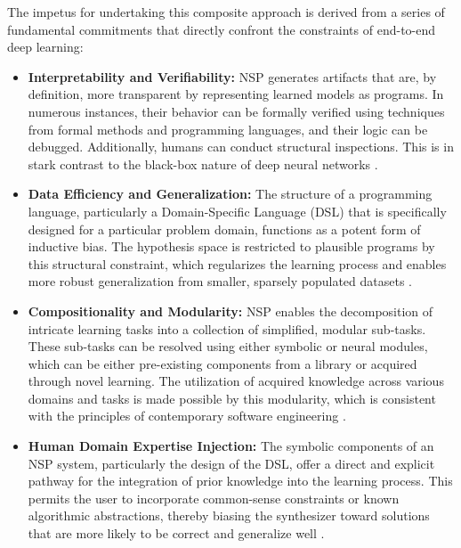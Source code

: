 \documentclass[12pt, a4paper]{report}
\begin{document}
The impetus for undertaking this composite approach is derived from a series of fundamental commitments that directly confront the constraints of end-to-end deep learning:
\begin{itemize}
    \item \textbf{Interpretability and Verifiability:} NSP generates artifacts that are, by definition, more transparent by representing learned models as programs. In numerous instances, their behavior can be formally verified using techniques from formal methods and programming languages, and their logic can be debugged. Additionally, humans can conduct structural inspections. This is in stark contrast to the black-box nature of deep neural networks \citep{bommasani2021opportunities}.
    \item \textbf{Data Efficiency and Generalization:} The structure of a programming language, particularly a Domain-Specific Language (DSL) that is specifically designed for a particular problem domain, functions as a potent form of inductive bias. The hypothesis space is restricted to plausible programs by this structural constraint, which regularizes the learning process and enables more robust generalization from smaller, sparsely populated datasets \citep{bommasani2021opportunities}.
    \item \textbf{Compositionality and Modularity:} NSP enables the decomposition of intricate learning tasks into a collection of simplified, modular sub-tasks. These sub-tasks can be resolved using either symbolic or neural modules, which can be either pre-existing components from a library or acquired through novel learning. The utilization of acquired knowledge across various domains and tasks is made possible by this modularity, which is consistent with the principles of contemporary software engineering \citep{gulwani2017program}.
    \item \textbf{ Human Domain Expertise Injection:} The symbolic components of an NSP system, particularly the design of the DSL, offer a direct and explicit pathway for the integration of prior knowledge into the learning process. This permits the user to incorporate common-sense constraints or known algorithmic abstractions, thereby biasing the synthesizer toward solutions that are more likely to be correct and generalize well \citep{gulwani2017program}.
\end{itemize}
\end{document}
